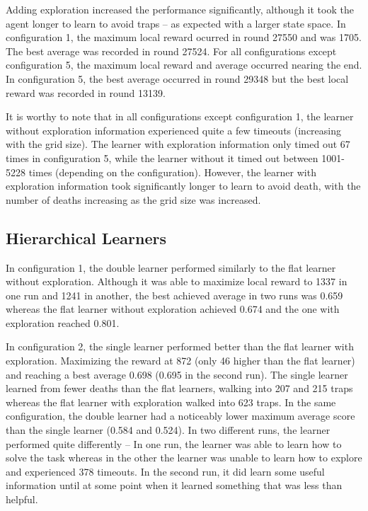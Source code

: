 \documentclass{article}
\begin{document}
	Adding exploration increased the performance significantly, although it took the agent longer to learn to avoid traps -- as expected with a larger state space. In configuration 1, the maximum local reward ocurred in round 27550 and was 1705. The best average was recorded in round 27524. For all configurations except configuration 5, the maximum local reward and average occurred nearing the end. In configuration 5, the best average occurred in round 29348 but the best local reward was recorded in round 13139.

	It is worthy to note that in all configurations except configuration 1, the learner without exploration information experienced quite a few timeouts (increasing with the grid size). The learner with exploration information only timed out 67 times in configuration 5, while the learner without it timed out between 1001-5228 times (depending on the configuration). However, the learner with exploration information took significantly longer to learn to avoid death, with the number of deaths increasing as the grid size was increased.

	\subsection{Hierarchical Learners}
	\label{s:res:meta}
	In configuration 1, the double learner performed similarly to the flat learner without exploration. Although it was able to maximize local reward to 1337 in one run and 1241 in another, the best achieved average in two runs was 0.659 whereas the flat learner without exploration achieved 0.674 and the one with exploration reached 0.801.
	
	In configuration 2, the single learner performed better than the flat learner with exploration. Maximizing the reward at 872 (only 46 higher than the flat learner) and reaching a best average 0.698 (0.695 in the second run). The single learner learned from fewer deaths than the flat learners, walking into 207 and 215 traps whereas the flat learner with exploration walked into 623 traps. 
	In the same configuration, the double learner had a noticeably lower maximum average score than the single learner (0.584 and 0.524). In two different runs, the learner performed quite differently -- In one run, the learner was able to learn how to solve the task whereas in the other the learner was unable to learn how to explore and experienced 378 timeouts. In the second run, it did learn some useful information until at some point when it learned something that was less than helpful.
\end{document}
